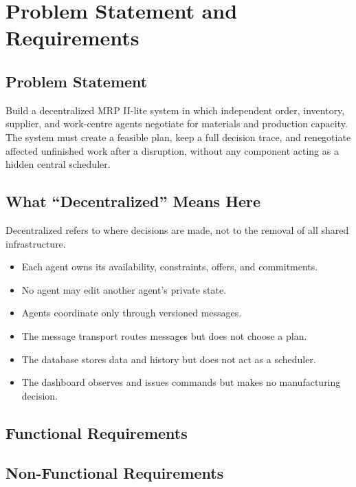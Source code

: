 \chapter{Problem Statement and Requirements}
\label{ch:problem}

\section{Problem Statement}

Build a decentralized MRP II-lite system in which independent order, inventory,
supplier, and work-centre agents negotiate for materials and production
capacity. The system must create a feasible plan, keep a full decision trace,
and renegotiate affected unfinished work after a disruption, without any
component acting as a hidden central scheduler.

\section{What ``Decentralized'' Means Here}

Decentralized refers to where decisions are made, not to the removal of all
shared infrastructure.

\begin{itemize}[nosep]
  \item Each agent owns its availability, constraints, offers, and
        commitments.
  \item No agent may edit another agent's private state.
  \item Agents coordinate only through versioned messages.
  \item The message transport routes messages but does not choose a plan.
  \item The database stores data and history but does not act as a scheduler.
  \item The dashboard observes and issues commands but makes no manufacturing
        decision.
\end{itemize}

\section{Functional Requirements}


\section{Non-Functional Requirements}

